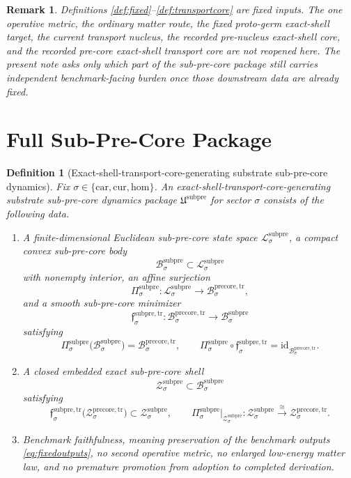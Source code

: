 \documentclass[11pt]{article}
\newcommand{\Car}{\mathrm{car}}
\newcommand{\Cur}{\mathrm{cur}}
\newcommand{\Hom}{\mathrm{hom}}
\newcommand{\PreCoreTrBody}[1]{\mathcal B_{#1}^{\mathrm{precore,tr}}}
\newcommand{\PreCoreTrShell}[1]{\mathcal Z_{#1}^{\mathrm{precore,tr}}}
\newcommand{\SubPreCorePackage}{\mathfrak U^{\mathrm{subpre}}}
\newcommand{\SubPreCoreSpace}[1]{\mathcal L_{#1}^{\mathrm{subpre}}}
\newcommand{\SubPreCoreBody}[1]{\mathcal B_{#1}^{\mathrm{subpre}}}
\newcommand{\SubPreCoreProj}[1]{\Pi_{#1}^{\mathrm{subpre}}}
\newcommand{\SubPreCoreTransportMin}[1]{\mathfrak f_{#1}^{\mathrm{subpre,tr}}}
\newcommand{\SubPreCoreShellSet}[1]{\mathcal Z_{#1}^{\mathrm{subpre}}}
\newtheorem{definition}{Definition}
\newtheorem{remark}{Remark}
\begin{document}
\begin{remark}
Definitions \ref{def:fixed}--\ref{def:transportcore} are fixed inputs. The one operative metric, the ordinary matter route, the fixed proto-germ exact-shell target, the current transport nucleus, the recorded pre-nucleus exact-shell core, and the recorded pre-core exact-shell transport core are not reopened here. The present note asks only which part of the sub-pre-core package still carries independent benchmark-facing burden once those downstream data are already fixed.
\end{remark}

\section{Full Sub-Pre-Core Package}

\begin{definition}[Exact-shell-transport-core-generating substrate sub-pre-core dynamics]
\label{def:subpre}
Fix \(\sigma\in\{\Car,\Cur,\Hom\}\). An exact-shell-transport-core-generating substrate sub-pre-core dynamics package \(\SubPreCorePackage\) for sector \(\sigma\) consists of the following data.
\begin{enumerate}
    \item A finite-dimensional Euclidean sub-pre-core state space \(\SubPreCoreSpace{\sigma}\), a compact convex sub-pre-core body
    \[
    \SubPreCoreBody{\sigma}\subset\SubPreCoreSpace{\sigma}
    \]
    with nonempty interior, an affine surjection
    \[
    \SubPreCoreProj{\sigma}:\SubPreCoreSpace{\sigma}\to\PreCoreTrBody{\sigma},
    \]
    and a smooth sub-pre-core minimizer
    \[
    \SubPreCoreTransportMin{\sigma}:\PreCoreTrBody{\sigma}\to\SubPreCoreBody{\sigma}
    \]
    satisfying
    \[
    \SubPreCoreProj{\sigma}\bigl(\SubPreCoreBody{\sigma}\bigr)=\PreCoreTrBody{\sigma},
    \qquad
    \SubPreCoreProj{\sigma}\circ\SubPreCoreTransportMin{\sigma}
    =
    \mathrm{id}_{\PreCoreTrBody{\sigma}}.
    \]
    \item A closed embedded exact sub-pre-core shell
    \[
    \SubPreCoreShellSet{\sigma}\subset\SubPreCoreBody{\sigma}
    \]
    satisfying
    \[
    \SubPreCoreTransportMin{\sigma}\bigl(\PreCoreTrShell{\sigma}\bigr)
    \subset
    \SubPreCoreShellSet{\sigma},
    \qquad
    \SubPreCoreProj{\sigma}\big|_{\SubPreCoreShellSet{\sigma}}
    :
    \SubPreCoreShellSet{\sigma}
    \xrightarrow{\cong}
    \PreCoreTrShell{\sigma}.
    \]
    \item Benchmark faithfulness, meaning preservation of the benchmark outputs \eqref{eq:fixedoutputs}, no second operative metric, no enlarged low-energy matter law, and no premature promotion from adoption to completed derivation.
\end{enumerate}
\end{definition}
\end{document}
